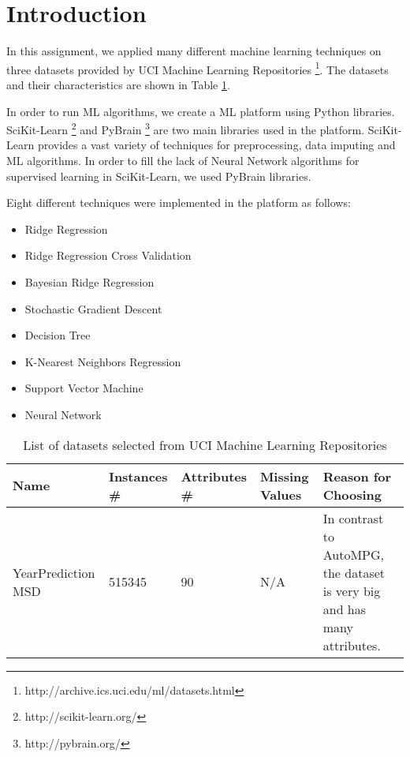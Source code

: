 \section{Introduction}
In this assignment, we applied many different machine learning techniques on three datasets provided by UCI Machine Learning Repositories \footnote{http://archive.ics.uci.edu/ml/datasets.html}. The datasets and their characteristics are shown in Table \ref{table:datasets}.

In order to run ML algorithms, we create a ML platform using Python libraries. SciKit-Learn \footnote{http://scikit-learn.org/} and PyBrain  \footnote{http://pybrain.org/} are two main libraries used in the platform. SciKit-Learn provides a vast variety of techniques for preprocessing, data imputing and ML algorithms. In order to fill the lack of Neural Network algorithms for supervised learning in SciKit-Learn, we used PyBrain libraries.

Eight different techniques were implemented in the platform as follows:
\begin{itemize}
  \item Ridge Regression
  \item Ridge Regression Cross Validation
  \item Bayesian Ridge Regression
  \item Stochastic Gradient Descent
  \item Decision Tree
  \item K-Nearest Neighbors Regression
  \item Support Vector Machine
  \item Neural Network  
\end{itemize}

\begin{center}
\begin{table}
    \begin{tabular}{ | p{2.5cm} | p{1cm} | p{1cm} | p{1cm} | p{7cm} |}
    \hline
    Name & Instances \# & Attributes \# & Missing Values & Reason for Choosing \\ \hline
    YearPrediction MSD & 515345 & 90 & N/A & In contrast to AutoMPG, the dataset is very big and has many attributes.\\ \hline
    \end{tabular}
    \caption{List of datasets selected from UCI Machine Learning Repositories}
    \label{table:datasets}
    \end{table}
\end{center}
